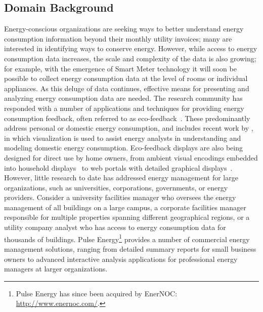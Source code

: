 \subsection{Domain Background}
\label{app:emu:proposal-background}

Energy-conscious organizations are seeking ways to better understand energy consumption information beyond their monthly utility invoices; many are interested in identifying ways to conserve energy. 
However, while access to energy consumption data increases, the scale and complexity of the data is also growing; for example, with the emergence of Smart Meter technology it will soon be possible to collect energy consumption data at the level of rooms or individual appliances. 
As this deluge of data continues, effective means for presenting and analyzing energy consumption data are needed. 
The research community has responded with a number of applications and techniques for providing energy consumption feedback, often referred to as eco-feedback~\cite{Froehlich2010}. 
These predominantly address personal or domestic energy consumption, and includes recent work by \citet{Goodwin2013}, in which visualization is used to assist energy analysts in understanding and modeling domestic energy consumption. 
Eco-feedback displays are also being designed for direct use by home owners, from ambient visual encodings embedded into household displays~\cite{Rodgers2011} to web portals with detailed graphical displays~\cite{Erickson2013}. 
However, little research to date has addressed energy management for large organizations, such as universities, corporations, governments, or energy providers. 
Consider a university facilities manager who oversees the energy management of all buildings on a large campus, a corporate facilities manager responsible for multiple properties spanning different geographical regions, or a utility company analyst who has access to energy consumption data for thousands of buildings. 
Pulse Energy\footnote{Pulse Energy has since been acquired by EnerNOC: \url{http://www.enernoc.com/}.} provides a number of commercial energy management solutions, ranging from detailed summary reports for small business owners to advanced interactive analysis applications for professional energy managers at larger organizations. 

